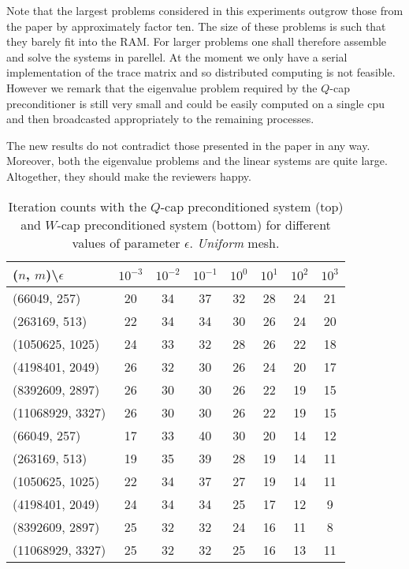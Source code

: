 \documentclass[10pt, a4paper]{article}
\begin{document}
Note that the largest problems considered in this experiments outgrow those from the paper by approximately factor ten. The size of 
these problems is such that they barely fit into the RAM. For larger problems one shall therefore assemble and solve the systems in 
parellel. At the moment we only have a serial implementation of the trace matrix and so distributed computing is not feasible. However
we remark that the eigenvalue problem required by the $Q$-cap preconditioner is still very small and could be easily computed on a single
cpu and then broadcasted appropriately to the remaining processes.

The new results do not contradict those presented in the paper in any way. Moreover, both the eigenvalue problems and the linear systems
are quite large. Altogether, they should make the reviewers happy.
\begin{table}[ht]
  \caption{Iteration counts with the $Q$-cap preconditioned system (top) and $W$-cap preconditioned system (bottom) for different 
values of parameter $\epsilon$. \textit{Uniform} mesh.
}
\label{tab:iter}
\footnotesize{
\begin{tabular}{l|ccccccc}
\hline
($n$, $m$)\textbackslash $\epsilon$ & $10^{-3}$ & $10^{-2}$ & $10^{-1}$ & $10^{0}$ & $10^{1}$ & $10^{2}$ & $10^{3}$\\
\hline
(66049, 257) & 20 & 34 & 37 & 32 & 28 & 24 & 21\\
(263169, 513) & 22 & 34 & 34 & 30 & 26 & 24 & 20\\
(1050625, 1025) & 24 & 33 & 32 & 28 & 26 & 22 & 18\\
(4198401, 2049) & 26 & 32 & 30 & 26 & 24 & 20 & 17\\
(8392609, 2897) & 26 & 30 & 30 & 26 & 22 & 19 & 15\\
(11068929, 3327) & 26 & 30 & 30 & 26 & 22 & 19 & 15\\
\hline
\hline
(66049, 257) & 17 & 33 & 40 & 30 & 20 & 14 & 12\\
(263169, 513) & 19 & 35 & 39 & 28 & 19 & 14 & 11\\
(1050625, 1025) & 22 & 34 & 37 & 27 & 19 & 14 & 11\\
(4198401, 2049) & 24 & 34 & 34 & 25 & 17 & 12 & 9\\
(8392609, 2897) & 25 & 32 & 32 & 24 & 16 & 11 & 8\\
(11068929, 3327) & 25 & 32 & 32 & 25 & 16 & 13 & 11\\
\hline
\end{tabular}
}
\end{table}
\end{document}
